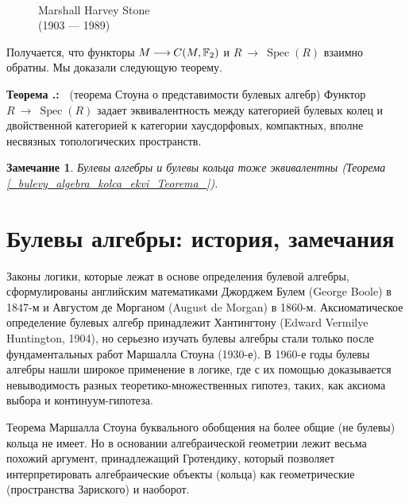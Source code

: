 \documentclass[12pt]{book}
\newcommand{\arrow}{{\:\longrightarrow\:}}
\def\endproof{\hbox{\vrule width 5pt height 5pt depth 0pt}}
\newcommand{\Spec}{\operatorname{Spec}}
\theoremstyle{upshape}
\newtheorem{zadacha}{Задача}[chapter]
\theoremstyle{generic}
\newtheorem{remark}[teorema]{Замечание}
\def\замечание{\begin{remark}}
\def\еза{\end{remark}}
\theoremstyle{upshapenonumber}
\newcommand{\следствие}{%
     \refstepcounter{teorema}
     {\noindent\bf Следствие \thechapter.\arabic{teorema}:\ }}
\newcommand{\пример}{%
     \refstepcounter{teorema}
     {\noindent\bf Пример \thechapter.\arabic{teorema}:\ }}
\newcommand{\лемма}{%
     \refstepcounter{teorema}
     {\noindent\bf Лемма \thechapter.\arabic{teorema}:\ }}
\newcommand{\теорема}{%
     \refstepcounter{teorema}
     {\noindent\bf Теорема \thechapter.\arabic{teorema}:\ }}
\newcommand{\утверждение}{%
     \refstepcounter{teorema}
     {\noindent\bf Утверждение \thechapter.\arabic{teorema}:\ }}
\def\хфилл{\hfill}
\def\ем{\em}
\def\задача{\begin{zadacha}}
\def\ез{\end{zadacha}}
\def\еу{\end{ukazanie}}
\def\ео{\end{opredelenie}}
\def\енум{\begin{enumerate}}
\def\ее{\end{enumerate}}
\begin{document}
\begin{figure}[ht]
\begin{center}
\\
{Marshall Harvey Stone\\
(1903 --- 1989)}
\end{center}
\end{figure}


Получается, что функторы $M \arrow C(M, {\Bbb F}_2)$
и $R \arrow \Spec(R)$ взаимно обратны. Мы доказали
следующую теорему.

\хфилл

\теорема
(теорема Стоуна о представимости булевых алгебр)
Функтор $R \arrow \Spec(R)$ задает 
эквивалентность между категорией булевых колец и двойственной 
категорией к категории хаусдорфовых, компактных, вполне несвязных топологических
пространств. \endproof

\замечание 
Булевы алгебры и булевы кольца тоже эквивалентны
(Теорема \ref{_bulevy_algebra_kolca_ekvi_Teorema_}).
\еза


\section{Булевы алгебры: история, замечания}


Законы логики, которые лежат в основе 
определения булевой алгебры, сформулированы английским математиками
Джорджем Булем (George Boole) в 1847-м и Августом де Морганом 
(August de Morgan) в 1860-м. Аксиоматическое определение
булевых алгебр принадлежит Хантингтону (Edward Vermilye
Huntington, 1904), но серьезно изучать булевы алгебры
стали только после фундаментальных работ Маршалла Стоуна
(1930-е). В 1960-е годы булевы алгебры нашли широкое применение
в логике, где с их помощью доказывается невыводимость
разных теоретико-множественных гипотез, таких, как
аксиома выбора и континуум-гипотеза.


Теорема Маршалла Стоуна буквального обобщения на
более общие (не булевы) кольца не имеет. Но в основании
алгебраической геометрии лежит весьма похожий аргумент, 
принадлежащий Гротендику, который
позволяет интерпретировать алгебраические объекты (кольца)
как геометрические (пространства Зариского) и наоборот.
\end{document}
